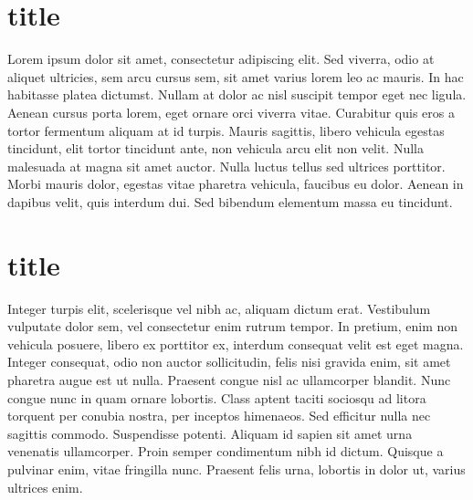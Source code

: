 

\section{title}

Lorem ipsum dolor sit amet, consectetur adipiscing elit. Sed viverra, odio at aliquet ultricies, sem arcu cursus sem, sit amet varius lorem leo ac mauris. In hac habitasse platea dictumst. Nullam at dolor ac nisl suscipit tempor eget nec ligula. Aenean cursus porta lorem, eget ornare orci viverra vitae. Curabitur quis eros a tortor fermentum aliquam at id turpis. Mauris sagittis, libero vehicula egestas tincidunt, elit tortor tincidunt ante, non vehicula arcu elit non velit. Nulla malesuada at magna sit amet auctor. Nulla luctus tellus sed ultrices porttitor. Morbi mauris dolor, egestas vitae pharetra vehicula, faucibus eu dolor. Aenean in dapibus velit, quis interdum dui. Sed bibendum elementum massa eu tincidunt.

\section{title}
Integer turpis elit, scelerisque vel nibh ac, aliquam dictum erat. Vestibulum vulputate dolor sem, vel consectetur enim rutrum tempor. In pretium, enim non vehicula posuere, libero ex porttitor ex, interdum consequat velit est eget magna. Integer consequat, odio non auctor sollicitudin, felis nisi gravida enim, sit amet pharetra augue est ut nulla. Praesent congue nisl ac ullamcorper blandit. Nunc congue nunc in quam ornare lobortis. Class aptent taciti sociosqu ad litora torquent per conubia nostra, per inceptos himenaeos. Sed efficitur nulla nec sagittis commodo. Suspendisse potenti. Aliquam id sapien sit amet urna venenatis ullamcorper. Proin semper condimentum nibh id dictum. Quisque a pulvinar enim, vitae fringilla nunc. Praesent felis urna, lobortis in dolor ut, varius ultrices enim.
